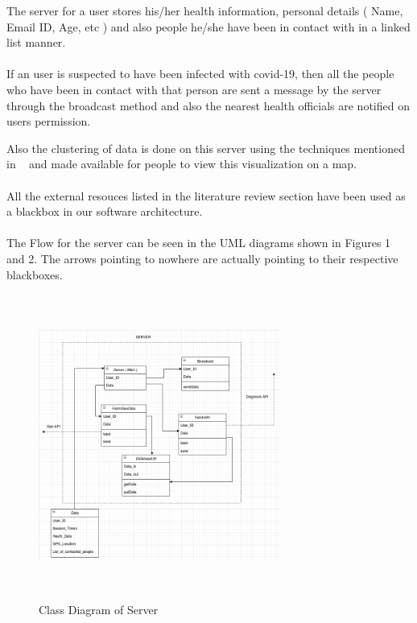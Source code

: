 \documentclass[10pt,twocolumn,letterpaper]{article}
\begin{document}
The server for a user stores his/her health information, personal details ( Name, Email ID, Age, etc ) and also people he/she have been in contact with in a linked list manner.\\\\
If an user is suspected to have been infected with covid-19, then all the people who have been in contact with that person are sent a message by the server through the broadcast method and also the nearest health officials are notified on users permission.

Also the clustering of data is done on this server using the techniques mentioned in ~\cite{7} and made available for people to view this visualization on a map.\\\\
All the external resouces listed in the literature review section have been used as a blackbox in our software architecture.\\\\
The Flow for the server can be seen in the UML diagrams shown in Figures 1 and 2. The arrows pointing to nowhere are actually pointing to their respective blackboxes.\newline\newline
\begin{figure}[h!]
  \centering
  \includegraphics[width=8cm, height=10cm]{UML_Class_Server}
  \caption[Caption for LOF]{Class Diagram of Server\footnotemark}
\end{figure}
\end{document}
